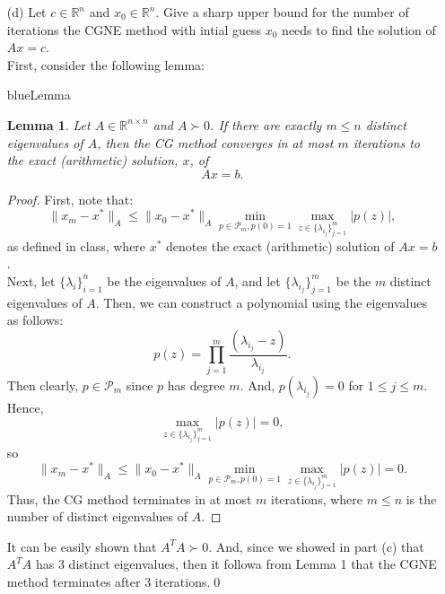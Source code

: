 \documentclass[12pt]{article}
\newtheorem{lemma}{Lemma}
\def\R{\mathbb{R}}
\begin{document}
\begin{itemize}
\item[(d)] Let $c\in\R^n$ and $x_0\in\R^n$.  Give a sharp upper bound for the number of iterations the CGNE method with intial guess $x_0$ needs to find the solution of $Ax=c$.\\

First, consider the following lemma:
\begin{mybox}{blue}{Lemma}
\begin{lemma}
Let $A \in \R^{n\times n}$ and $A\succ 0$.  If there are exactly $m \leq n$ distinct eigenvalues of $A$, then the CG method converges in at most $m$ iterations to the exact (arithmetic) solution, $x$, of
$$Ax = b.$$
\end{lemma}

\begin{proof}
First, note that:
$$\| x_m - x^*\|_A \leq \|x_0 - x^*\|_A \min_{p\in \mathcal{P}_m, p(0)=1} \max_{z\in \{\lambda_{i_j}\}_{j=1}^m} |p(z)|,$$
as defined in class, where $x^*$ denotes the exact (arithmetic) solution of $Ax = b$.\\
Next, let $\{\lambda_i\}_{i=1}^n$ be the eigenvalues of $A$, and let $\{\lambda_{i_j}\}_{j=1}^m$ be the $m$ distinct eigenvalues of $A$.  Then, we can construct a polynomial using the eigenvalues as follows:
$$p(z) = \prod\limits_{j=1}^m \frac{(\lambda_{i_j} - z)}{\lambda_{i_j}}.$$
Then clearly, $p\in \mathcal{P}_m$ since $p$ has degree $m$.  And, $p(\lambda_{i_j}) = 0$ for $1 \leq j \leq m$. Hence,
$$\max_{z\in \{\lambda_{i_j}\}_{j=1}^m} |p(z)| = 0,$$
so
$$\| x_m - x^*\|_A \leq \|x_0 - x^*\|_A \min_{p\in \mathcal{P}_m, p(0)=1} \max_{z\in \{\lambda_{i_j}\}_{j=1}^m} |p(z)| = 0.$$
Thus, the CG method terminates in at most $m$ iterations, where $m \leq n$ is the number of distinct eigenvalues of $A$.
\end{proof}
\end{mybox}

It can be easily shown that $A^TA \succ 0$.  And, since we showed in part (c) that $A^TA$ has 3 distinct eigenvalues, then it followa from Lemma 1 that the CGNE method terminates after 3 iterations.\qed\\
\end{itemize}
\end{document}
